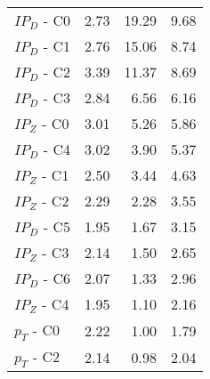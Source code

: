 \begin{table}
\begin{tabular}{lrrr}
\midrule
%
$IP_{D}$ - C0 &         2.73 &            19.29 &              9.68 \\
$IP_{D}$ - C1 &         2.76 &            15.06 &              8.74 \\
$IP_{D}$ - C2 &         3.39 &            11.37 &              8.69 \\
$IP_{D}$ - C3 &         2.84 &             6.56 &              6.16 \\
\vspace{\everyNthRowSpace}
$IP_{Z}$ - C0 &         3.01 &             5.26 &              5.86 \\
$IP_{D}$ - C4 &         3.02 &             3.90 &              5.37 \\
$IP_{Z}$ - C1 &         2.50 &             3.44 &              4.63 \\
$IP_{Z}$ - C2 &         2.29 &             2.28 &              3.55 \\
$IP_{D}$ - C5 &         1.95 &             1.67 &              3.15 \\
\vspace{\everyNthRowSpace}
$IP_{Z}$ - C3 &         2.14 &             1.50 &              2.65 \\
$IP_{D}$ - C6 &         2.07 &             1.33 &              2.96 \\
$IP_{Z}$ - C4 &         1.95 &             1.10 &              2.16 \\
$p_{T}$ - C0  &         2.22 &             1.00 &              1.79 \\
$p_{T}$ - C2  &         2.14 &             0.98 &              2.04 \\

\end{tabular}
\end{table}
